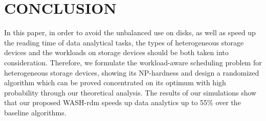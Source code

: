 \documentclass[conference]{IEEEtran}
\begin{document}
\section{CONCLUSION}\label{CONCLUSION}
In this paper, in order to avoid the unbalanced use on disks, as well as speed up the reading time of data analytical tasks, the types of heterogeneous storage devices and the workloads on storage devices should be both taken into consideration. Therefore, we formulate the workload-aware scheduling problem for heterogeneous storage devices, showing its NP-hardness and design a randomized algorithm which can be proved concentrated on its optimum with high probability through our theoretical analysis. The results of our simulations show that our proposed WASH-rdm speeds up data analytics up to 55\% over the baseline algorithms.
\end{document}
